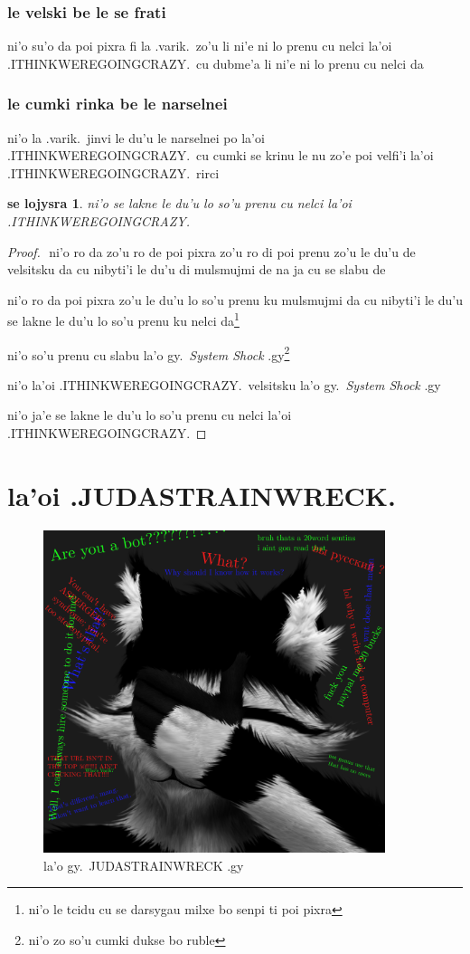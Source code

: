 \documentclass{report}
\newtheorem{thm}{se lojysra}
\begin{document}
\subsection{le velski be le se frati}
ni'o su'o da poi pixra fi la .varik.\ zo'u li ni'e ni lo prenu cu nelci la'oi .ITHINKWEREGOINGCRAZY.\ cu dubme'a li ni'e ni lo prenu cu nelci da

\subsection{le cumki rinka be le narselnei}
ni'o la .varik.\ jinvi le du'u le narselnei po la'oi .ITHINKWEREGOINGCRAZY.\ cu cumki se krinu le nu zo'e poi velfi'i la'oi .ITHINKWEREGOINGCRAZY.\ rirci

\begin{thm}
ni'o se lakne le du'u lo so'u prenu cu nelci la'oi .ITHINKWEREGOINGCRAZY.

\end{thm}
\begin{proof}
${}$
ni'o ro da zo'u ro de poi pixra zo'u ro di poi prenu zo'u le du'u de velsitsku da cu nibyti'i le du'u di mulsmujmi de na ja cu se slabu de

ni'o ro da poi pixra zo'u le du'u lo so'u prenu ku mulsmujmi da cu nibyti'i le du'u se lakne le du'u lo so'u prenu ku nelci da\footnote{ni'o le tcidu cu se darsygau milxe bo senpi ti poi pixra}

ni'o so'u prenu cu slabu la'o gy.\ \textit{System Shock} .gy\footnote{ni'o zo so'u cumki dukse bo ruble}

ni'o la'oi .ITHINKWEREGOINGCRAZY.\ velsitsku la'o gy.\ \textit{System Shock} .gy

ni'o ja'e se lakne le du'u lo so'u prenu cu nelci la'oi .ITHINKWEREGOINGCRAZY.

\end{proof}
\chapter{la'oi .JUDASTRAINWRECK.}
\begin{figure}[ht]
	\centering
	\includegraphics[width=10cm]{judastrainwreck/judastrainwreck.png}
	\caption[center]{la'o gy.\ JUDASTRAINWRECK .gy}
\end{figure}
\end{document}
